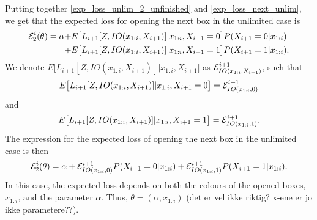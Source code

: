 

Putting together \eqref{exp_loss_unlim_2_unfinished} and \eqref{exp_loss_next_unlim}, we get that the expected loss for opening the next box in the unlimited case is
\begin{equation}
    \begin{aligned}
        \mathcal{E}^i_{2}(\theta) = \alpha 
        + &E \big[L_{i+1}[Z,IO(x_{1:i},X_{i+1})] |x_{1:i},X_{i+1}=0\big]P(X_{i+1}=0|x_{1:i}) \\
        +& E \big[L_{i+1}[Z,IO(x_{1:i},X_{i+1})] |x_{1:i},X_{i+1}=1\big]P(X_{i+1}=1|x_{1:i}).
    \end{aligned}
\end{equation}
We denote $E \big[L_{i+1}[Z,IO(x_{1:i},X_{i+1})] |x_{1:i},X_{i+1}\big]$ as $\mathcal{E}^{i+1}_{IO(x_{1:i},X_{i+1})}$, such that
\begin{equation*}
    E \big[L_{i+1}[Z,IO(x_{1:i},X_{i+1})] |x_{1:i},X_{i+1}=0\big] = \mathcal{E}^{i+1}_{IO(x_{1:i},0)}
\end{equation*}
and
\begin{equation*}
    E \big[L_{i+1}[Z,IO(x_{1:i},X_{i+1})] |x_{1:i},X_{i+1}=1\big] = \mathcal{E}^{i+1}_{IO(x_{1:i},1)}.
\end{equation*}
The expression for the expected loss of opening the next box in the unlimited case is then
\begin{equation}
\label{exp_loss_next_box_unlim}
    \begin{aligned}
        \mathcal{E}^i_{2}(\theta) 
        = \alpha + \mathcal{E}^{i+1}_{IO(x_{1:i},0)} P(X_{i+1}=0|x_{1:i})
        + \mathcal{E}^{i+1}_{IO(x_{1:i},1)} P(X_{i+1}=1|x_{1:i}).
    \end{aligned}
\end{equation}
In this case, the expected loss depends on both the colours of the opened boxes, $x_{1:i}$, and the parameter $\alpha$. Thus, $\theta = (\alpha,x_{1:i})$ (det er vel ikke riktig? x-ene er jo ikke parametere??).

